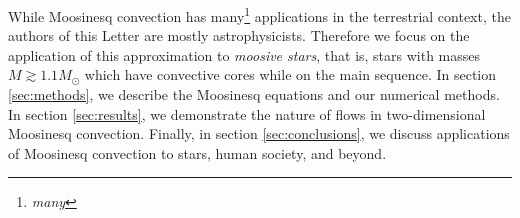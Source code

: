 While Moosinesq convection has many\footnote{\emph{many}} applications in the terrestrial context, the authors of this Letter are mostly astrophysicists.
Therefore we focus on the application of this approximation to \emph{moosive stars}, that is, stars with masses $M \gtrsim 1.1 M_\odot$ which have convective cores while on the main sequence.
In section \ref{sec:methods}, we describe the Moosinesq equations and our numerical methods.
In section \ref{sec:results}, we demonstrate the nature of flows in two-dimensional Moosinesq convection.
Finally, in section \ref{sec:conclusions}, we discuss applications of Moosinesq convection to stars, human society, and beyond.
